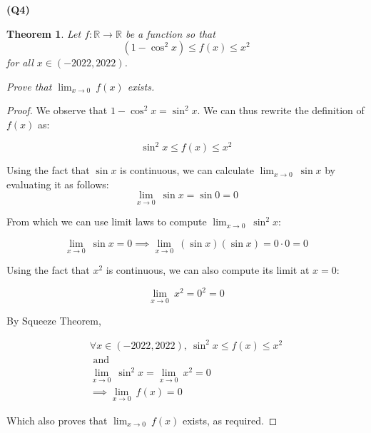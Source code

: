 \documentclass[12pt, a4paper]{article}
\newcommand{\R}{\mathbb{R}}
\newcommand{\displim}[1]{\displaystyle{\lim_{#1}\:}}
\newcommand{\zerolim}{\displim{x \to 0}}
\newtheorem{theorem}{Theorem}
\begin{document}
\textbf{(Q4)}

\begin{theorem}
    Let $f \colon \R \to \R$ be a function so that
    \[
        (1 - \cos^2x) \leq f(x) \leq x^2
    \]
    for all $x \in (-2022, 2022)$.

    Prove that $\zerolim f(x)$ exists.
\end{theorem}

\begin{proof}
    We observe that $1 - \cos^2x = \sin^2x$. We can thus rewrite the definition of
    $f(x)$ as:

    \[
        \sin^2x \leq f(x) \leq x^2
    \]

    Using the fact that $\sin x$ is continuous, we can calculate $\displim{x \to 0} \sin x$
    by evaluating it as follows:
    \[
        \displim{x \to 0} \sin x = \sin 0 = 0
    \]
    
    From which we can use limit laws to compute $\zerolim \sin^2x$:

    \[
        \zerolim \sin x = 0 \implies \zerolim (\sin x)(\sin x) = 0 \cdot 0 = 0
    \]

    Using the fact that $x^2$ is continuous, we can also compute its limit at $x = 0$:

    \[
        \zerolim x^2 = 0^2 = 0
    \]

    By Squeeze Theorem,

    \begin{gather*}
        \forall x \in (-2022, 2022),\: \sin^2x \leq f(x) \leq x^2\\
        \text{ and }\\
        \zerolim \sin^2x = \zerolim x^2 = 0\\
        \implies \zerolim f(x) = 0
    \end{gather*}

    Which also proves that $\zerolim f(x)$ exists, as required.
\end{proof}
\end{document}
